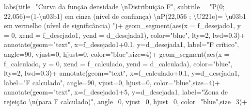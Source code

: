 \documentclass[
]{book}
\newenvironment{Shaded}{\begin{snugshade}}{\end{snugshade}}
\newcommand{\AttributeTok}[1]{\textcolor[rgb]{0.77,0.63,0.00}{#1}}
\newcommand{\DecValTok}[1]{\textcolor[rgb]{0.00,0.00,0.81}{#1}}
\newcommand{\FloatTok}[1]{\textcolor[rgb]{0.00,0.00,0.81}{#1}}
\newcommand{\FunctionTok}[1]{\textcolor[rgb]{0.00,0.00,0.00}{#1}}
\newcommand{\NormalTok}[1]{#1}
\newcommand{\SpecialCharTok}[1]{\textcolor[rgb]{0.00,0.00,0.00}{#1}}
\newcommand{\StringTok}[1]{\textcolor[rgb]{0.31,0.60,0.02}{#1}}
\begin{document}
\begin{Shaded}
\begin{Highlighting}[]
  \FunctionTok{labs}\NormalTok{(}\AttributeTok{title=}\StringTok{"Curva da função densidade }\SpecialCharTok{\textbackslash{}n}\StringTok{Distribuição F"}\NormalTok{, }
  \AttributeTok{subtitle =} \StringTok{"P(0; 22,056)=(1{-}\textbackslash{}u03b1) em cinza (nível de confiança) }\SpecialCharTok{\textbackslash{}n}\StringTok{P(22,056 ; \textbackslash{}U221e)= \textbackslash{}u03b1 em vermelho (nível de significância) "}\NormalTok{)}\SpecialCharTok{+}
  \FunctionTok{geom\_segment}\NormalTok{(}\FunctionTok{aes}\NormalTok{(}\AttributeTok{x =}\NormalTok{ f\_desejado1, }\AttributeTok{y =} \DecValTok{0}\NormalTok{, }\AttributeTok{xend =}\NormalTok{ f\_desejado1, }\AttributeTok{yend =}\NormalTok{ d\_desejada1), }\AttributeTok{color=}\StringTok{"blue"}\NormalTok{, }\AttributeTok{lty=}\DecValTok{2}\NormalTok{, }\AttributeTok{lwd=}\FloatTok{0.3}\NormalTok{)}\SpecialCharTok{+}
  \FunctionTok{annotate}\NormalTok{(}\AttributeTok{geom=}\StringTok{"text"}\NormalTok{, }\AttributeTok{x=}\NormalTok{f\_desejado1}\FloatTok{+0.1}\NormalTok{, }\AttributeTok{y=}\NormalTok{d\_desejada1, }\AttributeTok{label=}\StringTok{"F crítico"}\NormalTok{, }\AttributeTok{angle=}\DecValTok{90}\NormalTok{, }\AttributeTok{vjust=}\DecValTok{0}\NormalTok{, }\AttributeTok{hjust=}\DecValTok{0}\NormalTok{, }\AttributeTok{color=}\StringTok{"blue"}\NormalTok{,}\AttributeTok{size=}\DecValTok{4}\NormalTok{)}\SpecialCharTok{+}
    \FunctionTok{geom\_segment}\NormalTok{(}\FunctionTok{aes}\NormalTok{(}\AttributeTok{x =}\NormalTok{ f\_calculado, }\AttributeTok{y =} \DecValTok{0}\NormalTok{, }\AttributeTok{xend =}\NormalTok{ f\_calculado, }\AttributeTok{yend =}\NormalTok{ d\_calculada), }\AttributeTok{color=}\StringTok{"blue"}\NormalTok{, }\AttributeTok{lty=}\DecValTok{2}\NormalTok{, }\AttributeTok{lwd=}\FloatTok{0.3}\NormalTok{)}\SpecialCharTok{+}
  \FunctionTok{annotate}\NormalTok{(}\AttributeTok{geom=}\StringTok{"text"}\NormalTok{, }\AttributeTok{x=}\NormalTok{f\_calculado}\FloatTok{+0.1}\NormalTok{, }\AttributeTok{y=}\NormalTok{d\_desejada1, }\AttributeTok{label=}\StringTok{"F calculado"}\NormalTok{, }\AttributeTok{angle=}\DecValTok{90}\NormalTok{, }\AttributeTok{vjust=}\DecValTok{0}\NormalTok{, }\AttributeTok{hjust=}\DecValTok{0}\NormalTok{, }\AttributeTok{color=}\StringTok{"blue"}\NormalTok{,}\AttributeTok{size=}\DecValTok{4}\NormalTok{)}\SpecialCharTok{+}
 \FunctionTok{annotate}\NormalTok{(}\AttributeTok{geom=}\StringTok{"text"}\NormalTok{, }\AttributeTok{x=}\NormalTok{f\_desejado1}\SpecialCharTok{+}\DecValTok{5}\NormalTok{, }\AttributeTok{y=}\NormalTok{d\_desejada1, }\AttributeTok{label=}\StringTok{"Zona de rejeição }\SpecialCharTok{\textbackslash{}n}\StringTok{(para F calculado)"}\NormalTok{, }\AttributeTok{angle=}\DecValTok{0}\NormalTok{, }\AttributeTok{vjust=}\DecValTok{0}\NormalTok{, }\AttributeTok{hjust=}\DecValTok{0}\NormalTok{, }\AttributeTok{color=}\StringTok{"blue"}\NormalTok{,}\AttributeTok{size=}\DecValTok{3}\NormalTok{)}\SpecialCharTok{+}

\end{Highlighting}
\end{Shaded}
\end{document}
